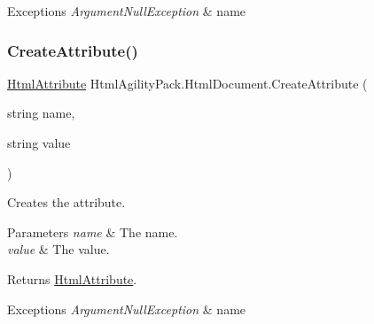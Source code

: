 \begin{DoxyExceptions}{Exceptions}
{\em Argument\+Null\+Exception} & name\\
\hline
\end{DoxyExceptions}
\mbox{\label{class_html_agility_pack_1_1_html_document_ac6eb06bcc4dff1f20584a625eea28f31}} 
\subsubsection{\texorpdfstring{Create\+Attribute()}{CreateAttribute()}\hspace{0.1cm}{\footnotesize\ttfamily [2/2]}}
{\footnotesize\ttfamily \hyperlink{class_html_agility_pack_1_1_html_attribute}{Html\+Attribute} Html\+Agility\+Pack.\+Html\+Document.\+Create\+Attribute (\begin{DoxyParamCaption}\item[{string}]{name,  }\item[{string}]{value }\end{DoxyParamCaption})\hspace{0.3cm}{\ttfamily [inline]}}



Creates the attribute. 


\begin{DoxyParams}{Parameters}
{\em name} & The name.\\
\hline
{\em value} & The value.\\
\hline
\end{DoxyParams}
\begin{DoxyReturn}{Returns}
\hyperlink{class_html_agility_pack_1_1_html_attribute}{Html\+Attribute}.
\end{DoxyReturn}

\begin{DoxyExceptions}{Exceptions}
{\em Argument\+Null\+Exception} & name\\
\hline
\end{DoxyExceptions}
\mbox{\label{class_html_agility_pack_1_1_html_document_a318060538be0d5308bc34c7a4aab4aba}} 
